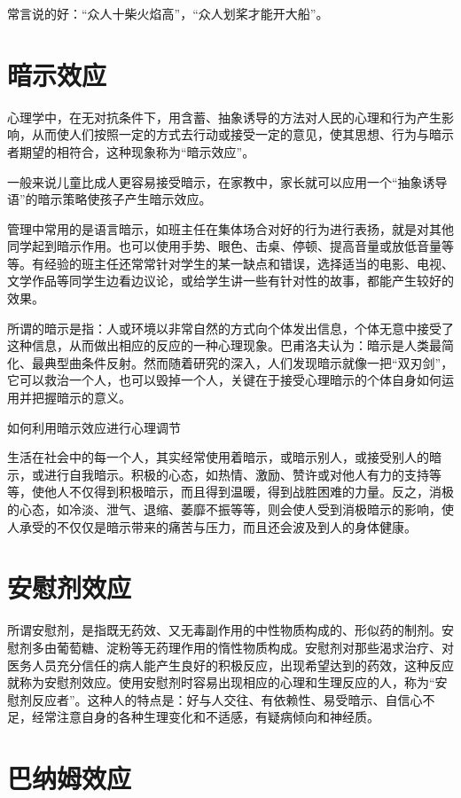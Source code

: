 \documentclass[11pt]{ctexart}
\begin{document}
常言说的好：“众人十柴火焰高”，“众人划桨才能开大船”。
\section{暗示效应}
\label{sec-4}


心理学中，在无对抗条件下，用含蓄、抽象诱导的方法对人民的心理和行为产生影响，从而使人们按照一定的方式去行动或接受一定的意见，使其思想、行为与暗示者期望的相符合，这种现象称为“暗示效应”。

一般来说儿童比成人更容易接受暗示，在家教中，家长就可以应用一个“抽象诱导语”的暗示策略使孩子产生暗示效应。

管理中常用的是语言暗示，如班主任在集体场合对好的行为进行表扬，就是对其他同学起到暗示作用。也可以使用手势、眼色、击桌、停顿、提高音量或放低音量等等。有经验的班主任还常常针对学生的某一缺点和错误，选择适当的电影、电视、文学作品等同学生边看边议论，或给学生讲一些有针对性的故事，都能产生较好的效果。

所谓的暗示是指：人或环境以非常自然的方式向个体发出信息，个体无意中接受了这种信息，从而做出相应的反应的一种心理现象。巴甫洛夫认为：暗示是人类最简化、最典型曲条件反射。然而随着研究的深入，人们发现暗示就像一把“双刃剑”，它可以救治一个人，也可以毁掉一个人，关键在于接受心理暗示的个体自身如何运用并把握暗示的意义。

如何利用暗示效应进行心理调节

生活在社会中的每一个人，其实经常使用着暗示，或暗示别人，或接受别人的暗示，或进行自我暗示。积极的心态，如热情、激励、赞许或对他人有力的支持等等，使他人不仅得到积极暗示，而且得到温暖，得到战胜困难的力量。反之，消极的心态，如冷淡、泄气、退缩、萎靡不振等等，则会使人受到消极暗示的影响，使人承受的不仅仅是暗示带来的痛苦与压力，而且还会波及到人的身体健康。
\section{安慰剂效应}
\label{sec-5}


所谓安慰剂，是指既无药效、又无毒副作用的中性物质构成的、形似药的制剂。安慰剂多由葡萄糖、淀粉等无药理作用的惰性物质构成。安慰剂对那些渴求治疗、对医务人员充分信任的病人能产生良好的积极反应，出现希望达到的药效，这种反应就称为安慰剂效应。使用安慰剂时容易出现相应的心理和生理反应的人，称为“安慰剂反应者”。这种人的特点是：好与人交往、有依赖性、易受暗示、自信心不足，经常注意自身的各种生理变化和不适感，有疑病倾向和神经质。
\section{巴纳姆效应}
\label{sec-6}
\end{document}
